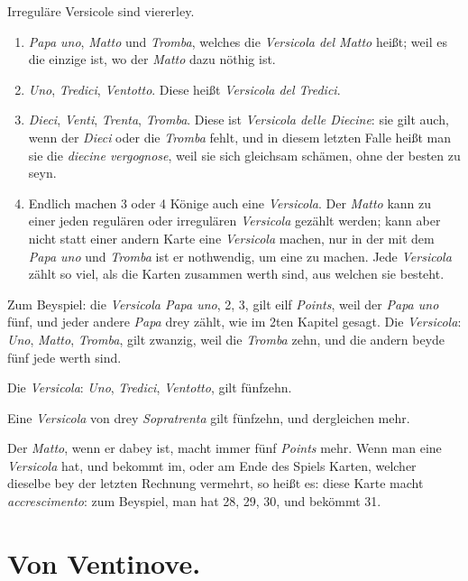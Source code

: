 \documentclass[11pt,a6paper,twoside]{article}
\begin{document}
Irreguläre Versicole sind viererley.
\begin{enumerate}
\item \textit{Papa uno}, \textit{Matto} und \textit{Tromba}, welches die \textit{Versicola del Matto} heißt; weil es die einzige ist, wo der \textit{Matto} dazu nöthig ist.
\item \textit{Uno}, \textit{Tredici}, \textit{Ventotto}. Diese heißt \textit{Versicola del Tredici}.
\item \textit{Dieci}, \textit{Venti}, \textit{Trenta}, \textit{Tromba}. Diese ist \textit{Versicola delle Diecine}: sie gilt auch, wenn der \textit{Dieci} oder die \textit{Tromba} fehlt, und in diesem letzten Falle heißt man sie die \textit{diecine vergognose}, weil sie sich gleichsam schämen, ohne der besten zu seyn.
\item Endlich machen 3 oder 4 Könige auch eine \textit{Versicola}. Der \textit{Matto} kann zu einer jeden regulären oder irregulären \textit{Versicola} gezählt werden; kann aber nicht statt einer andern Karte eine \textit{Versicola} machen, nur in der mit dem \textit{Papa uno} und \textit{Tromba} ist er nothwendig, um eine zu machen. Jede \textit{Versicola} zählt so viel, als die Karten zusammen werth sind, aus welchen sie besteht.
\end{enumerate}

Zum Beyspiel: die \textit{Versicola Papa uno}, 2, 3, gilt eilf \textit{Points}, weil der \textit{Papa uno} fünf, und jeder andere \textit{Papa} drey zählt, wie im 2ten Kapitel gesagt. Die \textit{Versicola}: \textit{Uno}, \textit{Matto}, \textit{Tromba}, gilt zwanzig, weil die \textit{Tromba} zehn, und die andern beyde fünf jede werth sind.

Die \textit{Versicola}: \textit{Uno}, \textit{Tredici}, \textit{Ventotto}, gilt fünfzehn.

Eine \textit{Versicola} von drey \textit{Sopratrenta} gilt fünfzehn, und dergleichen mehr.

Der \textit{Matto}, wenn er dabey ist, macht immer fünf \textit{Points} mehr.
Wenn man eine \textit{Versicola} hat, und bekommt im, oder am Ende des Spiels Karten, welcher dieselbe bey der letzten Rechnung vermehrt, so heißt es: diese Karte macht \textit{accrescimento}: zum Beyspiel, man hat 28, 29, 30, und bek\"ommt 31.


\section{Von Ventinove.}
\end{document}
